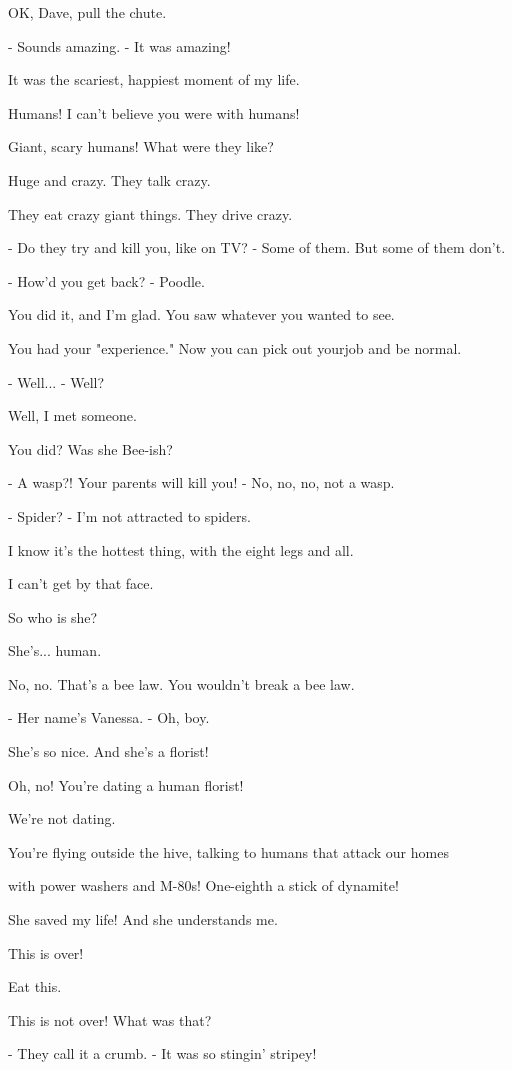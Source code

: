 \documentclass[journal]{IEEEtran}
\begin{document}
  
OK, Dave, pull the chute.

  
- Sounds amazing.
- It was amazing!

  
It was the scariest,
happiest moment of my life.

  
Humans! I can't believe
you were with humans!

  
Giant, scary humans!
What were they like?

  
Huge and crazy. They talk crazy.

  
They eat crazy giant things.
They drive crazy.

  
- Do they try and kill you, like on TV?
- Some of them. But some of them don't.

  
- How'd you get back?
- Poodle.

  
You did it, and I'm glad. You saw
whatever you wanted to see.

  
You had your "experience." Now you
can pick out yourjob and be normal.

  
- Well...
- Well?

  
Well, I met someone.

  
You did? Was she Bee-ish?

  
- A wasp?! Your parents will kill you!
- No, no, no, not a wasp.

  
- Spider?
- I'm not attracted to spiders.

  
I know it's the hottest thing,
with the eight legs and all.

  
I can't get by that face.

  
So who is she?

  
She's... human.

  
No, no. That's a bee law.
You wouldn't break a bee law.

  
- Her name's Vanessa.
- Oh, boy.

  
She's so nice. And she's a florist!

  
Oh, no! You're dating a human florist!

  
We're not dating.

  
You're flying outside the hive, talking
to humans that attack our homes

  
with power washers and M-80s!
One-eighth a stick of dynamite!

  
She saved my life!
And she understands me.

  
This is over!

  
Eat this.

  
This is not over! What was that?

  
- They call it a crumb.
- It was so stingin' stripey!
\end{document}
